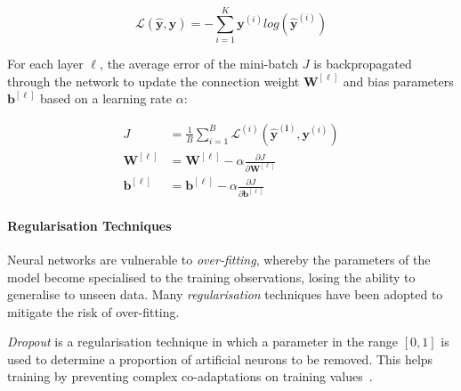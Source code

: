 \begin{equation}
  \mathcal{L}(\bm{\hat{y}}, \bm{y}) = - \sum_{i=1}^K \bm{y}^{(i)} log (\bm{\hat{y}}^{(i)})
\end{equation}

For each layer $\ell$, the average error of the mini-batch $J$ is backpropagated through the network to update the connection weight $\bm{W}^{[\ell]}$ and bias parameters $\bm{b}^{[\ell]}$ based on a learning rate $\alpha$:

\begin{align}
J &= \frac{1}{B} \sum_{i=1}^B \mathcal{L}^{(i)}(\bm{\hat{y}^{(i)}}, \bm{y}^{(i)})\\
\bm{W}^{[\ell]} &= \bm{W}^{[\ell]} - \alpha \frac{\partial J}{\partial \bm{W}^{[\ell]}}\\
\bm{b}^{[\ell]} &= \bm{b}^{[\ell]} - \alpha \frac{\partial J}{\partial \bm{b}^{[\ell]}}
\end{align}




\paragraph*{Regularisation Techniques}

Neural networks are vulnerable to \emph{over-fitting}, whereby the parameters of the model become specialised to the training observations, losing the ability to generalise to unseen data. Many \emph{regularisation} techniques have been adopted to mitigate the risk of over-fitting.

\emph{Dropout} is a regularisation technique in which a parameter in the range $[0,1]$ is used to determine a proportion of artificial neurons to be removed. This helps training by preventing complex co-adaptations on training values~\cite{Goodfellow2016}.



